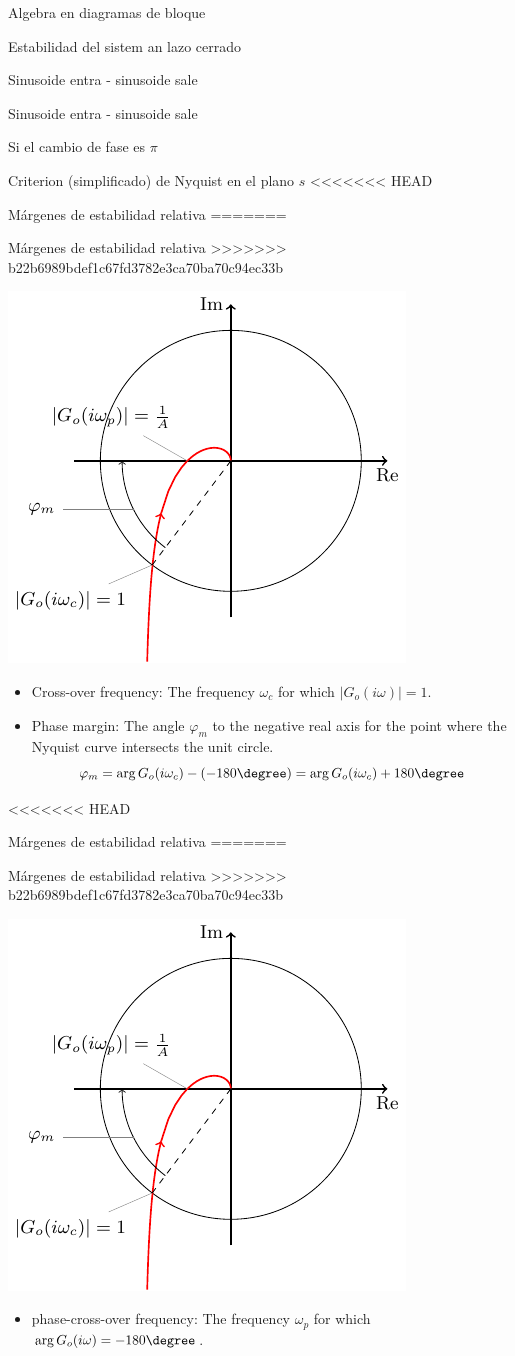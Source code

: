 \documentclass[presentation,aspectratio=169]{beamer}
\begin{document}
\begin{frame}[label={sec:org8e8e439}]{Algebra en diagramas de bloque}
\begin{frame}[label={sec:org5218f19}]{Estabilidad del sistem an lazo cerrado}
\begin{frame}[label={sec:org4ce2307}]{Sinusoide entra - sinusoide sale}
\begin{frame}[label={sec:orgc598966}]{Sinusoide entra - sinusoide sale}
\begin{frame}[label={sec:orgbd54147}]{Si el cambio de fase es \(\pi\)}
\begin{frame}[label={sec:orgf06388b}]{Criterion (simplificado) de Nyquist en el plano \(s\)}
<<<<<<< HEAD
\begin{frame}[label={sec:org5967884}]{Márgenes de estabilidad relativa}
=======
\begin{frame}[label={sec:org77733d3}]{Márgenes de estabilidad relativa}
>>>>>>> b22b6989bdef1c67fd3782e3ca70ba70c94ec33b
\begin{center}
\includegraphics[width=0.38\linewidth]{../../figures/implane-nyquist-margins}
\end{center}
\begin{itemize}
\item Cross-over frequency: The frequency \(\omega_c\) for which \(|G_o(i\omega)| = 1\).
\item Phase margin: The angle \(\varphi_m\) to the negative real axis for the point where the Nyquist curve intersects the unit circle. \[\varphi_m = \arg G_o(i\omega_c) - (-180\degree) = \arg G_o(i\omega_c) + 180\degree\]
\end{itemize}
\end{frame}
<<<<<<< HEAD
\begin{frame}[label={sec:orgb5ba0e3}]{Márgenes de estabilidad relativa}
=======
\begin{frame}[label={sec:orgf4be51c}]{Márgenes de estabilidad relativa}
>>>>>>> b22b6989bdef1c67fd3782e3ca70ba70c94ec33b
\begin{center}
\includegraphics[width=0.38\linewidth]{../../figures/implane-nyquist-margins}
\end{center}
\begin{itemize}
\item phase-cross-over frequency: The frequency \(\omega_p\) for which \(\arg G_o(i\omega) = -180\degree\).

\end{itemize}
\end{frame}
\end{frame}
\end{frame}
\end{frame}
\end{frame}
\end{frame}
\end{frame}
\end{frame}
\end{frame}
\end{document}

